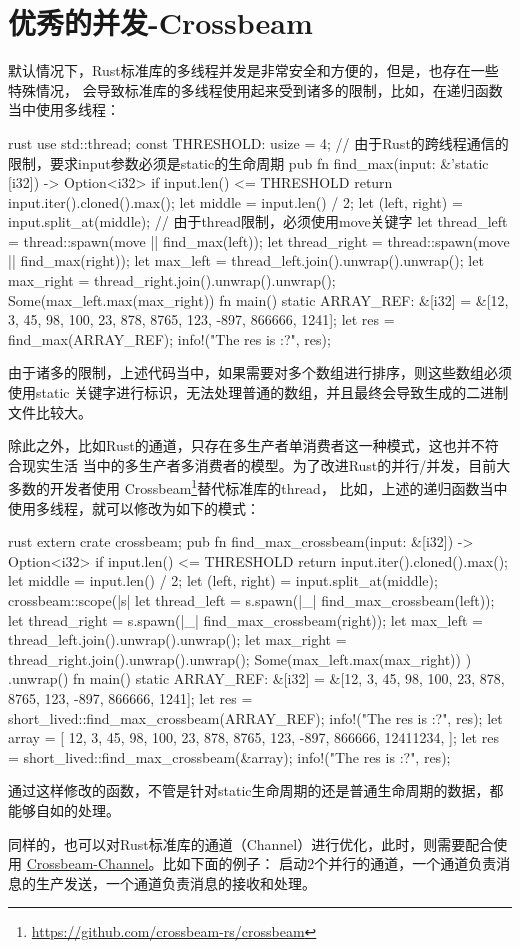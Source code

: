 \section{优秀的并发-Crossbeam}
默认情况下，Rust标准库的多线程并发是非常安全和方便的，但是，也存在一些特殊情况，
会导致标准库的多线程使用起来受到诸多的限制，比如，在递归函数当中使用多线程：
\begin{code-block}{rust}
use std::thread;
const THRESHOLD: usize = 4;
// 由于Rust的跨线程通信的限制，要求input参数必须是static的生命周期
pub fn find_max(input: &'static [i32]) -> Option<i32> {
    if input.len() <= THRESHOLD {
        return input.iter().cloned().max();
    }
    let middle = input.len() / 2;
    let (left, right) = input.split_at(middle);
    // 由于thread限制，必须使用move关键字
    let thread_left = thread::spawn(move || find_max(left));
    let thread_right = thread::spawn(move || find_max(right));
    let max_left = thread_left.join().unwrap().unwrap();
    let max_right = thread_right.join().unwrap().unwrap();
    Some(max_left.max(max_right))
}
fn main() {
    static ARRAY_REF: &[i32] = &[12, 3, 45, 98, 100, 23, 878, 8765, 123, -897, 866666, 1241];
    let res = find_max(ARRAY_REF);
    info!("The res is {:?}", res);
}
\end{code-block}
由于诸多的限制，上述代码当中，如果需要对多个数组进行排序，则这些数组必须使用static
关键字进行标识，无法处理普通的数组，并且最终会导致生成的二进制文件比较大。

除此之外，比如Rust的通道，只存在多生产者单消费者这一种模式，这也并不符合现实生活
当中的多生产者多消费者的模型。为了改进Rust的并行/并发，目前大多数的开发者使用
Crossbeam\footnote{\url{https://github.com/crossbeam-rs/crossbeam}}替代标准库的thread，
比如，上述的递归函数当中使用多线程，就可以修改为如下的模式：
\begin{code-block}{rust}
extern crate crossbeam;
pub fn find_max_crossbeam(input: &[i32]) -> Option<i32> {
    if input.len() <= THRESHOLD {
        return input.iter().cloned().max();
    }
    let middle = input.len() / 2;
    let (left, right) = input.split_at(middle);
    crossbeam::scope(|s| {
        let thread_left = s.spawn(|_| find_max_crossbeam(left));
        let thread_right = s.spawn(|_| find_max_crossbeam(right));
        let max_left = thread_left.join().unwrap().unwrap();
        let max_right = thread_right.join().unwrap().unwrap();
        Some(max_left.max(max_right))
    })
    .unwrap()
}
fn main() {
    static ARRAY_REF: &[i32] = &[12, 3, 45, 98, 100, 23, 878, 8765, 123, -897, 866666, 1241];
    let res = short_lived::find_max_crossbeam(ARRAY_REF);
    info!("The res is {:?}", res);
    let array = [
        12, 3, 45, 98, 100, 23, 878, 8765, 123, -897, 866666, 12411234,
    ];
    let res = short_lived::find_max_crossbeam(&array);
    info!("The res is {:?}", res);
}
\end{code-block}
通过这样修改的函数，不管是针对static生命周期的还是普通生命周期的数据，都能够自如的处理。

同样的，也可以对Rust标准库的通道（Channel）进行优化，此时，则需要配合使用
\href{https://github.com/crossbeam-rs/crossbeam}{Crossbeam-Channel}。比如下面的例子：
启动2个并行的通道，一个通道负责消息的生产发送，一个通道负责消息的接收和处理。


